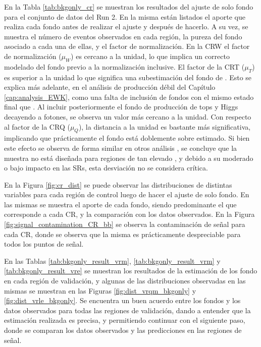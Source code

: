 En la Tabla \ref{tab:bkgonly_cr} se muestran los resultados del ajuste de solo fondo para el conjunto de datos del Run 2. En la misma están listados el aporte que realiza cada fondo antes de realizar el ajuste y después de hacerlo. A su vez, se muestra el número de eventos observados en cada región, la pureza del fondo asociado a cada una de ellas, y el factor de normalización. 
En la CRW el factor de normalización ($\mu_W$) es cercano a la unidad, lo que implica un correcto modelado del fondo previo a la normalización inclusive. El factor de la CRT ($\mu_T$) es superior a la unidad lo que significa una subestimación del fondo de \ttbarph. Esto se explica más adelante, en el análisis de producción débil del Capítulo \ref{cap:analysis_EWK}, como una falta de inclusión de fondos con el mismo estado final que \ttbarph. Al incluir posteriormente el fondo de producción de tops y Higgs decayendo a fotones, se observa un valor más cercano a la unidad. Con respecto al factor de la CRQ ($\mu_Q$), la distancia a la unidad es bastante más significativa, implicando que prácticamente el fondo está doblemente sobre estimado. Si bien este efecto se observa de forma similar en otros análisis \cite{Alonso:2689095}, se concluye que la muestra no está diseñada para regiones de tan elevado \met, y debido a su moderado o bajo impacto en las SRs, esta desviación no se considera crítica. 


En la Figura \ref{fig:cr_dist} se puede observar las distribuciones de distintas variables para cada región de control luego de hacer el ajuste de solo fondo. En las mismas se muestra el aporte de cada fondo, siendo predominante el que corresponde a cada CR, y la comparación con los datos observados. En la Figura \ref{fig:signal_contamination_CR_bb} se observa la contaminación de señal para cada CR, donde se observa que la misma es prácticamente despreciable para todos los puntos de señal.



En las Tablas \ref{tab:bkgonly_result_vrm}, \ref{tab:bkgonly_result_vrm} y \ref{tab:bkgonly_result_vre} se muestran los resultados de la estimación de los fondo en cada región de validación, y algunas de las distribuciones observadas en las mismas se muestran en las Figuras \ref{fig:dist_vrqm_bkgonly} y \ref{fig:dist_vrle_bkgonly}. Se encuentra un buen acuerdo entre los fondos y los datos observados para todas las regiones de validación, dando a entender que la estimación realizada es precisa, y permitiendo continuar con el siguiente paso, donde se comparan los datos observados y las predicciones en las regiones de señal. 





